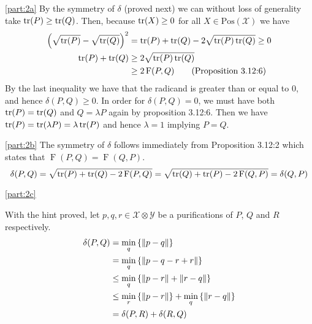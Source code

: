 \documentclass[boxes,pages,color=SeaGreen]{homework}
\newcommand{\X}{\mathcal{X}}
\newcommand{\Y}{\mathcal{Y}}
\newcommand{\Fid}{\operatorname{F}}
\newcommand{\Pos}{\mathrm{Pos}}
\begin{document}
\begin{solution}
    \ref{part:2a}
    By the symmetry of $\delta$ (proved next) we can without loss of generality take $\tr(P)\geq \tr(Q)$.
    Then, because $\tr(X) \geq 0$ for all $X\in\Pos(\X)$ we have
    \begin{align*}
        \qty(\sqrt{\tr(P)} - \sqrt{\tr(Q)})^2 & = \tr(P) + \tr(Q) - 2\sqrt{\tr(P)\tr(Q)} \geq 0 \\
        \tr(P) + \tr(Q)                       & \geq 2\sqrt{\tr(P)\tr(Q)}                       \\
                                              & \geq 2\Fid(P, Q) \tag{Proposition 3.12:6}
    \end{align*}
    By the last inequality we have that the radicand is greater than or equal to 0, and hence $\delta(P, Q) \geq 0$.
    In order for $\delta(P, Q) = 0$, we must have both $\tr(P) = \tr(Q)$ and $Q = \lambda P$ again by proposition 3.12:6.
    Then we have $\tr(P) = \tr(\lambda P) = \lambda \tr(P)$ and hence $\lambda = 1$ implying $P = Q$.

    \ref{part:2b}
    The symmetry of $\delta$ follows immediately from Proposition 3.12:2 which states that $\Fid(P, Q) = \Fid(Q, P)$.
    \begin{equation*}
        \delta(P, Q) = \sqrt{\tr(P) + \tr(Q) - 2\Fid(P, Q)} = \sqrt{\tr(Q) + \tr(P) - 2\Fid(Q, P)} = \delta(Q, P)
    \end{equation*}

    \ref{part:2c}

    With the hint proved, let $p, q, r\in\X\otimes\Y$ be a purifications of $P$, $Q$ and $R$ respectively.
    \begin{align*}
        \delta(P, Q) & = \min_{q}\qty{\norm{p - q}}                                 \\
                     & = \min_{q}\qty{\norm{p - q - r + r}}                         \\
                     & \leq \min_{q}\qty{\norm{p - r} + \norm{r - q}}               \\
                     & \leq \min_{r}\qty{\norm{p - r}} + \min_{q}\qty{\norm{r - q}} \\
                     & = \delta(P, R) + \delta(R, Q)
    \end{align*}

\end{solution}

\end{document}
